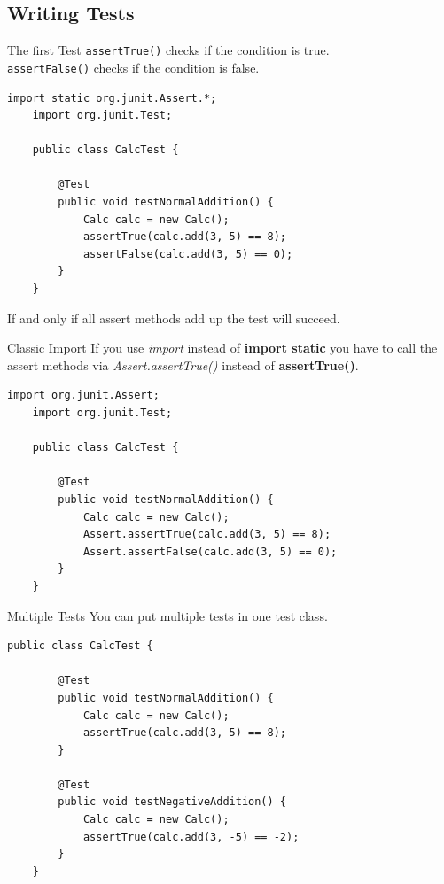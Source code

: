 \subsection{Writing Tests}
\begin{frame}[fragile]{The first Test}
	\texttt{assertTrue()} checks if the condition is true. \\
	\texttt{assertFalse()} checks if the condition is false.
	\begin{lstlisting}[basicstyle=\ttfamily\scriptsize, escapechar=!]
	import static org.junit.Assert.*;
	import org.junit.Test;

	public class CalcTest {

	    @Test
	    public void testNormalAddition() {
	        Calc calc = new Calc();
	        assertTrue(calc.add(3, 5) == 8);
	        assertFalse(calc.add(3, 5) == 0);
	    }
	}
	\end{lstlisting}
	If and only if all assert methods add up the test will succeed.
\end{frame}

\begin{frame}[fragile]{Classic Import}
	If you use \emph{import} instead of \textbf{import static} you have to call 
	the assert methods via \emph{Assert.assertTrue()} instead of \textbf{assertTrue()}.
	\begin{lstlisting}[basicstyle=\ttfamily\scriptsize, escapechar=!]
	import org.junit.Assert;
	import org.junit.Test;

	public class CalcTest {

	    @Test
	    public void testNormalAddition() {
	        Calc calc = new Calc();
	        Assert.assertTrue(calc.add(3, 5) == 8);
	        Assert.assertFalse(calc.add(3, 5) == 0);
	    }
	}
	\end{lstlisting}
\end{frame}

\begin{frame}[fragile]{Multiple Tests}
	You can put multiple tests in one test class.
	\begin{lstlisting}[basicstyle=\ttfamily\scriptsize, escapechar=!]
	public class CalcTest {

	    @Test
	    public void testNormalAddition() {
	        Calc calc = new Calc();
	        assertTrue(calc.add(3, 5) == 8);
	    }

	    @Test
	    public void testNegativeAddition() {
	        Calc calc = new Calc();
	        assertTrue(calc.add(3, -5) == -2);
	    }
	}
	\end{lstlisting}
\end{frame}

